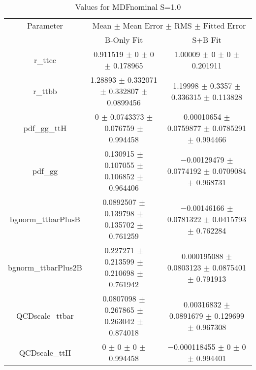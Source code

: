 \begin{table}
\centering
\caption{Values for MDFnominal S=1.0}
\begin{tabular}{ccc}
\toprule
Parameter & \multicolumn{2}{c}{Mean $\pm$ Mean Error $\pm$ RMS $\pm$ Fitted Error}\\
 & B-Only Fit & S+B Fit\\
\midrule
r\_ttcc & \num{0.911519} $\pm$ \num{0} $\pm$ \num{0} $\pm$ \num{0.178965} & \num{1.00009} $\pm$ \num{0} $\pm$ \num{0} $\pm$ \num{0.201911}\\
r\_ttbb & \num{1.28893} $\pm$ \num{0.332071} $\pm$ \num{0.332807} $\pm$ \num{0.0899456} & \num{1.19998} $\pm$ \num{0.3357} $\pm$ \num{0.336315} $\pm$ \num{0.113828}\\
pdf\_gg\_ttH & \num{0} $\pm$ \num{0.0743373} $\pm$ \num{0.076759} $\pm$ \num{0.994458} & \num{0.00010654} $\pm$ \num{0.0759877} $\pm$ \num{0.0785291} $\pm$ \num{0.994466}\\
pdf\_gg & \num{0.130915} $\pm$ \num{0.107055} $\pm$ \num{0.106852} $\pm$ \num{0.964406} & \num{-0.00129479} $\pm$ \num{0.0774192} $\pm$ \num{0.0709084} $\pm$ \num{0.968731}\\
bgnorm\_ttbarPlusB & \num{0.0892507} $\pm$ \num{0.139798} $\pm$ \num{0.135702} $\pm$ \num{0.761259} & \num{-0.00146166} $\pm$ \num{0.0781322} $\pm$ \num{0.0415793} $\pm$ \num{0.762284}\\
bgnorm\_ttbarPlus2B & \num{0.227271} $\pm$ \num{0.213599} $\pm$ \num{0.210698} $\pm$ \num{0.761942} & \num{0.000195088} $\pm$ \num{0.0803123} $\pm$ \num{0.0875401} $\pm$ \num{0.791913}\\
QCDscale\_ttbar & \num{0.0807098} $\pm$ \num{0.267865} $\pm$ \num{0.263042} $\pm$ \num{0.874018} & \num{0.00316832} $\pm$ \num{0.0891679} $\pm$ \num{0.129699} $\pm$ \num{0.967308}\\
QCDscale\_ttH & \num{0} $\pm$ \num{0} $\pm$ \num{0} $\pm$ \num{0.994458} & \num{-0.000118455} $\pm$ \num{0} $\pm$ \num{0} $\pm$ \num{0.994401}\\
\bottomrule
\end{tabular}
\end{table}